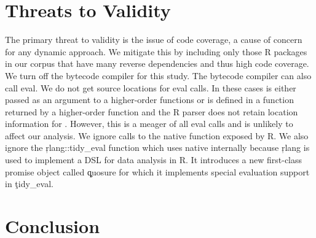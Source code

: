 \documentclass[conference]{IEEEtran}
\begin{document}
%
%

\section{Threats to Validity} The primary threat to validity is the issue of
code coverage, a cause of concern for any dynamic approach. We mitigate this by
including only those R packages in our corpus that have many reverse
dependencies and thus high code coverage. We turn off the bytecode compiler for
this study. The bytecode compiler can also call eval. We do not get source
locations for \UndefinedEvalsRnd eval calls. In these cases \eval is either
passed as an argument to a higher-order functions or is defined in a function
returned by a higher-order function and the R parser does not retain location
information for \eval. However, this is a meager \PercentUndefinedEval of all
eval calls and is unlikely to affect our analysis. We ignore calls to the native
\eval function exposed by R. We also ignore the \c{rlang::tidy_eval} function
which uses native \eval internally because \c{rlang} is used to implement a DSL
for data analysis in R. It introduces a new first-class promise object called
\c{quosure} for which it implements special evaluation support in \c{tidy_eval}.

\section{Conclusion}



\end{document}
